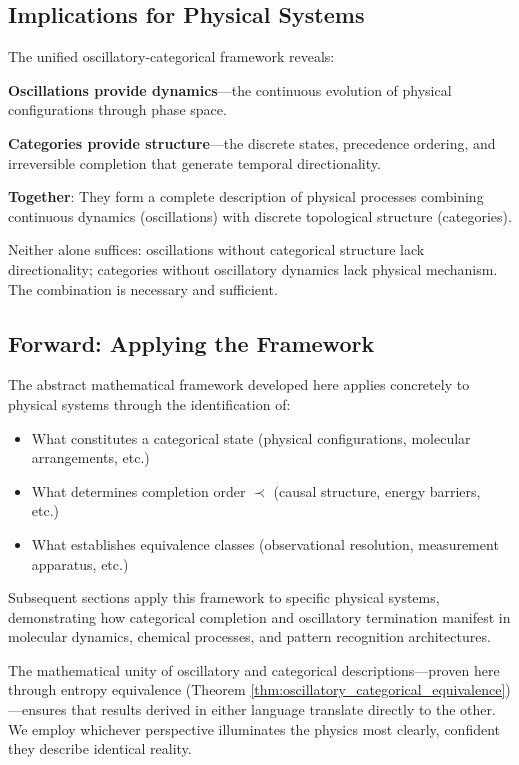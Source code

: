 \documentclass[12pt,a4paper]{article}
\begin{document}
\subsection{Implications for Physical Systems}

The unified oscillatory-categorical framework reveals:

\textbf{Oscillations provide dynamics}—the continuous evolution of physical configurations through phase space.

\textbf{Categories provide structure}—the discrete states, precedence ordering, and irreversible completion that generate temporal directionality.

\textbf{Together}: They form a complete description of physical processes combining continuous dynamics (oscillations) with discrete topological structure (categories).

Neither alone suffices: oscillations without categorical structure lack directionality; categories without oscillatory dynamics lack physical mechanism. The combination is necessary and sufficient.

\subsection{Forward: Applying the Framework}

The abstract mathematical framework developed here applies concretely to physical systems through the identification of:
\begin{itemize}
\item What constitutes a categorical state (physical configurations, molecular arrangements, etc.)
\item What determines completion order $\prec$ (causal structure, energy barriers, etc.)
\item What establishes equivalence classes (observational resolution, measurement apparatus, etc.)
\end{itemize}

Subsequent sections apply this framework to specific physical systems, demonstrating how categorical completion and oscillatory termination manifest in molecular dynamics, chemical processes, and pattern recognition architectures.

The mathematical unity of oscillatory and categorical descriptions—proven here through entropy equivalence (Theorem \ref{thm:oscillatory_categorical_equivalence})—ensures that results derived in either language translate directly to the other. We employ whichever perspective illuminates the physics most clearly, confident they describe identical reality.
\end{document}
